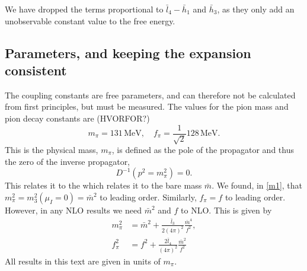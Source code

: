 We have dropped the terms proportional to $\bar l_4 - \bar h_1$ and $\bar h_3$, as they only add an unobservable constant value to the free energy.



\subsection*{Parameters, and keeping the expansion consistent}
The coupling constants are free parameters, and can therefore not be calculated from first principles, but must be measured.
The values for the pion mass and pion decay constants are (HVORFOR?)
\begin{equation}
    m_\pi = 131 \, \mathrm{MeV}, \quad f_\pi = \frac{1}{\sqrt 2} 128 \, \mathrm{MeV}.
\end{equation}
This is the physical mass, $m_\pi$, is defined as the pole of the propagator and thus the zero of the inverse propagator,
\begin{equation}
    D^{-1}(p^2 = m_\pi^2) = 0.
\end{equation}
This relates it to the which relates it to the bare mass $\bar m$.
We found, in \cref{m1}, that $m_\pi^2 = m_3^2(\mu_I = 0) = \bar m^2$ to leading order.
Similarly, $f_\pi = f$ to leading order.
However, in any NLO results we need $\bar m^2$ and $f$ to NLO.
This is given by~\cite{Gasser-Leutwyler:chiral}
\begin{align}
    \label{equation bare mass}
    m_\pi^2 & = \bar m^2 + \frac{\bar l_3}{2 (4\pi)^2} \frac{\bar m^4}{f^2}, \\
    \label{equation bare decay constant}
    f_\pi^2 & = f^2 + \frac{2\bar l_4}{(4\pi)^2} \frac{\bar m^2}{f^2}
\end{align}
All results in this text are given in units of $m_\pi$.

